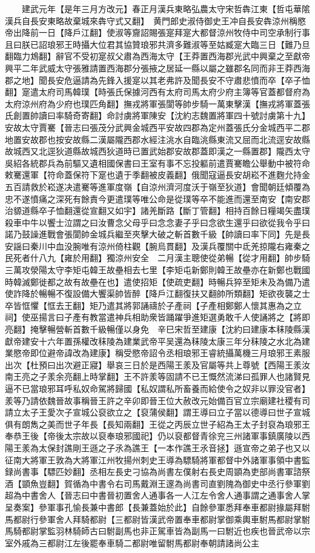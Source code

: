 　　建武元年【是年三月方改元】春正月漢兵東略弘農太守宋哲犇江東【哲屯華隂漢兵自長安東略故棄城來犇守式又翻】　黄門郎史淑侍御史王冲自長安犇涼州稱愍帝出降前一日【降戶江翻】使淑等齎詔賜張寔拜寔大都督涼州牧侍中司空承制行事且曰朕已詔琅邪王時攝大位君其協贊琅邪共濟多難淑等至姑臧寔大臨三日【難乃旦翻臨力鴆翻】辭官不受初寔叔父肅為西海太守【王莽置西海郡光武中興棄之至獻帝興平二年武威太守張雅請置西海郡分張掖之居延一縣以屬之雖郡名同而非王莽西海郡之地】聞長安危逼請為先鋒入援寔以其老弗許及聞長安不守肅悲憤而卒【卒子恤翻】寔遣太府司馬韓璞【時張氏保據河西有太府司馬太府少府主簿等官蓋都督府為太府涼州府為少府也璞匹角翻】撫戎將軍張閬等帥步騎一萬東擊漢【撫戎將軍蓋張氏創置帥讀曰率騎奇寄翻】命討虜將軍陳安【沈約志魏置將軍四十號討虜第十九】安故太守賈騫【晉志曰張茂分武興金城西平安故四郡為定州蓋張氏分金城西平二郡地置安故郡也按安故縣二漢屬隴西郡水經注洮水自臨洮縣東流又屈而北流逕安故縣故城西又北逕狄道縣故城西狄道時已置武始郡安故郡蓋即漢之一縣置郡】隴西太守吳紹各統郡兵為前驅又遺相國保書曰王室有事不忘投軀前遣賈騫瞻公舉動中被符命敕騫還軍【符命蓋保符下寔也遺于季翻被皮義翻】俄聞寇逼長安胡崧不進麴允持金五百請救於崧遂决遣騫等進軍度嶺【自涼州濟河度沃于嶺至狄道】會聞朝廷傾覆為忠不遂憤痛之深死有餘責今更遣璞等唯公命是從璞等卒不能進而還至南安【南安郡治䝠道縣卒子恤翻還從宣翻又如宇】諸羌斷路【斷丁管翻】相持百餘日糧竭矢盡璞殺車中牛以饗士泣謂之曰汝曹念父母乎曰念念妻子乎曰念欲生還乎曰欲從我令乎曰諾乃鼓譟進戰會張閬帥金城兵繼至夾擊大破之斬首數千級【帥讀曰率下同】先是長安謡曰秦川中血没腕唯有涼州倚柱觀【腕烏貫翻】及漢兵覆關中氐羌掠隴右雍秦之民死者什八九【雍於用翻】獨涼州安全　二月漢主聰使從弟暢【從才用翻】帥步騎三萬攻滎陽太守李矩屯韓王故壘相去七里【李矩屯新鄭則韓王故壘亦在新鄭也戰國時韓滅鄭徙都之故有故壘在也】遣使招矩【使疏吏翻】時暢兵猝至矩未及為備乃遣使詐降於暢暢不復設備大饗渠帥皆醉【降戶江翻復扶又翻帥所類翻】矩欲夜襲之士卒皆恇懼【恇去王翻】矩乃遣其將郭誦禱於子產祠【子產相鄭鄭人懷其惠為之立祠】使巫揚言曰子產有教當遣神兵相助衆皆踊躍爭進矩選勇敢千人使誦將之【將即亮翻】掩擊暢營斬首數千級暢僅以身免　辛巳宋哲至建康【沈約曰建康本秣陵縣漢獻帝建安十六年置孫權改秣陵為建業武帝平吴還為秣陵太康三年分秣陵之水北為建業愍帝即位避帝諱改為建康】稱受愍帝詔令丞相琅邪王睿統攝萬機三月琅邪王素服出次【杜預曰出次避正寢】舉哀三日於是西陽王羕及官屬等共上尊號【西陽王羕汝南王亮之子羕余亮翻上時掌翻】王不許羕等固請不已王慨然流涕曰孤罪人也諸賢見逼不已當琅邪耳呼私奴命駕將歸國【私奴謂私所畜養而給使令之奴非以罪没官者】羕等乃請依魏晉故事稱晉王許之辛卯即晉王位大赦改元始備百官立宗廟建社稷有司請立太子王愛次子宣城公裒欲立之【裒蒲侯翻】謂王導曰立子當以德導曰世子宣城俱有朗雋之美而世子年長【長知兩翻】王從之丙辰立世子紹為王太子封裒為琅邪王奉恭王後【帝後太宗故以裒奉琅邪國祀】仍以裒都督青徐兖三州諸軍事鎮廣陵以西陽王羕為太保封譙剛王遜之子氶為譙王【一本作譙王氶音拯】遜宣帝之弟子也又以征南大將軍王敦為大將軍江州牧揚州刺史王導為驃騎將軍都督中外諸軍事領中書監録尚書事【驃匹妙翻】丞相左長史刁協為尚書左僕射右長史周顗為吏部尚書軍諮祭酒【顗魚豈翻】賀循為中書令右司馬戴淵王邃為尚書司直劉隗為御史中丞行參軍劉超為中書舍人【晉志曰中書晉初置舍人通事各一人江左令舍人通事謂之通事舍人掌呈奏案】參軍事孔愉長兼中書郎【長兼蓋始於此】自餘參軍悉拜奉車都尉掾屬拜駙馬都尉行參軍舍人拜騎都尉【三都尉皆漢武帝置奉車都尉掌御乘輿車駙馬都尉掌駙馬騎都尉掌監羽林騎師古曰駙副馬也非正駕車皆為副馬一曰駙近也疾也晉武帝以宗室外戚為三都尉江左後罷奉車騎二都尉唯留駙馬都尉奉朝請諸尚公主
